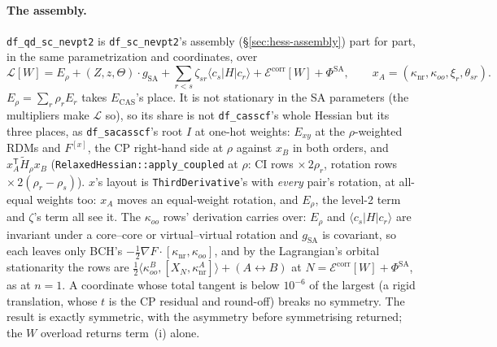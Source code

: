 \documentclass[11pt]{article}
\newcommand{\code}[1]{\texttt{#1}}
\newcommand{\Lag}{\mathcal L}
\newcommand{\Ecas}{E_{\mathrm{CAS}}}
\newcommand{\T}{\mathsf T}
\begin{document}
\paragraph{The assembly.} \code{df\_qd\_sc\_nevpt2} is
\code{df\_sc\_nevpt2}'s assembly (\S\ref{sec:hess-assembly}) part for
part, in the same parametrization and coordinates, over
\begin{equation}
  \Lag[W] = E_\rho + (Z, z, \Theta)\cdot g_{\mathrm{SA}}
    + \sum_{r<s}\zeta_{sr}\langle c_s|H|c_r\rangle
    + \mathcal E^{\mathrm{corr}}[W] + \Phi^{\mathrm{SA}},\qquad
  x_A = (\kappa_{\mathrm{nr}}, \kappa_{oo}, \xi_r, \theta_{sr}).
\end{equation}
$E_\rho = \sum_r\rho_rE_r$ takes $\Ecas$'s place. It is not stationary in
the SA parameters (the multipliers make $\Lag$ so), so its share is not
\code{df\_casscf}'s whole Hessian but its three places, as
\code{df\_sacasscf}'s root $I$ at one-hot weights: $E_{xy}$ at the
$\rho$-weighted RDMs and $F^{[x]}$, the CP right-hand side at $\rho$
against $x_B$ in both orders, and $x_A^\T\tilde H_\rho x_B$
(\code{RelaxedHessian::apply\_coupled} at $\rho$: CI rows $\times\,2\rho_r$,
rotation rows $\times\,2(\rho_r - \rho_s)$). $x$'s layout is
\code{ThirdDerivative}'s with \emph{every} pair's rotation, at all-equal
weights too: $x_A$ moves an equal-weight rotation, and $E_\rho$, the
level-2 term and $\zeta$'s term all see it. The $\kappa_{oo}$ rows'
derivation carries over: $E_\rho$ and $\langle c_s|H|c_r\rangle$ are
invariant under a core--core or virtual--virtual rotation and
$g_{\mathrm{SA}}$ is covariant, so each leaves only BCH's $-\tfrac12\nabla
F\cdot[\kappa_{\mathrm{nr}}, \kappa_{oo}]$, and by the Lagrangian's orbital
stationarity the rows are $\tfrac12\langle\kappa^B_{oo},
[X_N, \kappa^A_{\mathrm{nr}}]\rangle + (A\leftrightarrow B)$ at $N =
\mathcal E^{\mathrm{corr}}[W] + \Phi^{\mathrm{SA}}$, as at $n = 1$. A
coordinate whose total tangent is below $10^{-6}$ of the largest (a rigid
translation, whose $t$ is the CP residual and round-off) breaks no
symmetry. The result is exactly symmetric, with the asymmetry before
symmetrising returned; the $W$ overload returns term~(i) alone.
\end{document}
